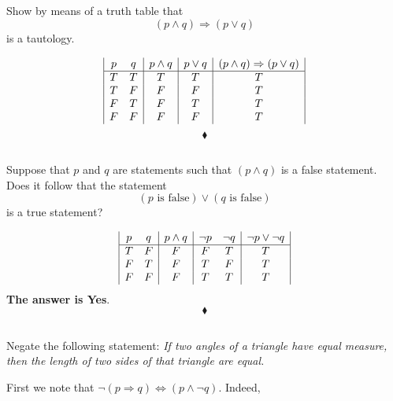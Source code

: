 \subsection{}
\begin{tcolorbox}
Show by means of a truth table  that  
$$(p\wedge q) \Rightarrow (p\vee q)$$
is a tautology.
\end{tcolorbox}
\begin{displaymath}
\begin{array}{|c c|c|c|c|}
p & q &p\wedge q& p\vee q&(p\wedge q) \Rightarrow (p\vee q) \\ 
\hline 
T & T & T&T&T\\
T & F & F&F&T\\
F & T & F&T&T\\
F & F & F&F&T\\
\end{array}
\end{displaymath}
$$\blacklozenge$$
\subsection{}
\begin{tcolorbox}
Suppose that $p$ and $q$ are statements such that $(p \wedge q)$ is a false statement. Does it follow that the statement
$$(p\text{ is false}) \vee (q\text{ is false})$$is a true statement?
\end{tcolorbox}
\begin{displaymath}
\begin{array}{|c c|c|c c| c|}
p & q &p\wedge q& \lnot p&\lnot q& \lnot p \vee \lnot q\\ %
\hline %
T & F & F&F&T&T\\
F & T & F&T&F&T\\
F & F & F&T&T&T\\
\end{array}
\end{displaymath}
\textbf{The answer is Yes}.
$$\blacklozenge$$

\subsection{}
\begin{tcolorbox}
Negate the following statement: \textit{If two angles of a triangle have equal measure, then the length of two sides of that triangle are equal.}
\end{tcolorbox}
First we note that $\lnot(p\Rightarrow q)\Leftrightarrow (p \wedge \lnot q)$. Indeed,

